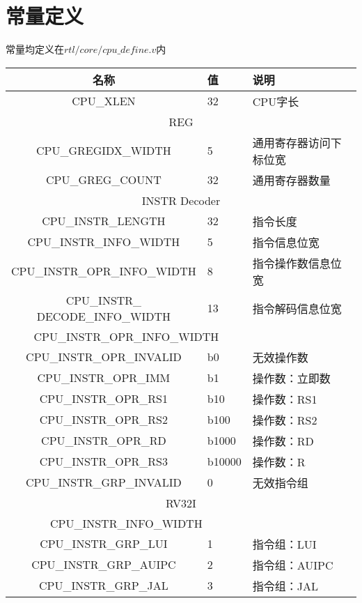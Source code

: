 \section{常量定义}
常量均定义在$rtl/core/cpu\_define.v$内\\
\begin{center}
\begin{tabular}{|c|p{3cm}|p{6cm}|}
    \hline
    名称    &   值  &   说明\\\hline
    CPU\_XLEN   &   32  &   CPU字长\\\hline
    \multicolumn{3}{|c|}{REG}\\\hline
    CPU\_GREGIDX\_WIDTH &   5   &   通用寄存器访问下标位宽\\\hline
    CPU\_GREG\_COUNT    &   32  &   通用寄存器数量\\\hline
    \multicolumn{3}{|c|}{INSTR Decoder}\\\hline
    CPU\_INSTR\_LENGTH & 32 & 指令长度\\\hline
    CPU\_INSTR\_INFO\_WIDTH & 5 & 指令信息位宽\\\hline
    CPU\_INSTR\_OPR\_INFO\_WIDTH & 8 & 指令操作数信息位宽\\\hline
    \makecell[{}{p{3cm}}]{CPU\_INSTR\_ \\ DECODE\_INFO\_WIDTH} & 13 & 指令解码信息位宽\\\hline
    \multicolumn{2}{|c|}{CPU\_INSTR\_OPR\_INFO\_WIDTH}&\\\hline
    CPU\_INSTR\_OPR\_INVALID & b0 & 无效操作数\\\hline
    CPU\_INSTR\_OPR\_IMM & b1 & 操作数：立即数\\\hline
    CPU\_INSTR\_OPR\_RS1 & b10 & 操作数：RS1\\\hline
    CPU\_INSTR\_OPR\_RS2 & b100 & 操作数：RS2\\\hline
    CPU\_INSTR\_OPR\_RD & b1000 & 操作数：RD\\\hline
    CPU\_INSTR\_OPR\_RS3 & b10000 & 操作数：R\\\hline
    CPU\_INSTR\_GRP\_INVALID & 0 & 无效指令组\\\hline
    \multicolumn{3}{|c|}{RV32I}\\\hline
    \multicolumn{2}{|c|}{CPU\_INSTR\_INFO\_WIDTH}&\\\hline
    CPU\_INSTR\_GRP\_LUI & 1 & 指令组：LUI\\\hline
    CPU\_INSTR\_GRP\_AUIPC & 2 & 指令组：AUIPC\\\hline
    CPU\_INSTR\_GRP\_JAL & 3 & 指令组：JAL\\\hline

\end{tabular}
\end{center}
